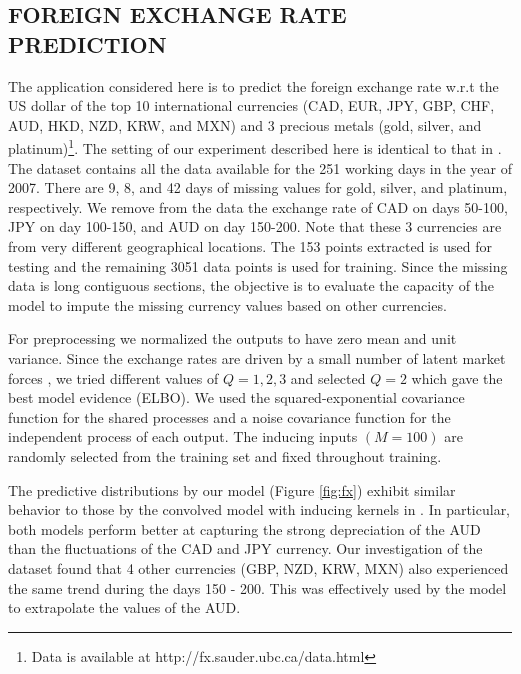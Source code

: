 \subsection{FOREIGN EXCHANGE RATE PREDICTION}
The application considered here is to predict the foreign exchange rate w.r.t the US dollar of the top 10 international currencies (CAD, EUR, JPY, GBP, CHF, AUD, HKD, NZD, KRW, and MXN) and 3 precious metals (gold, silver, and platinum)\footnote{Data is available at http://fx.sauder.ubc.ca/data.html}. 
The setting of our experiment described here is identical to that in \citet{alvarez2010efficient}.
The dataset contains all the data available for the 251 working days in the year of 2007.
There are 9, 8, and 42 days of missing values  for gold, silver, and platinum, respectively.
We remove from the data the exchange rate of CAD on days 50-100, JPY on day 100-150, and AUD on day 150-200.
Note that these 3 currencies are from very different geographical locations. 
The 153 points extracted is used for testing and the remaining 3051 data points is used for training.
Since the missing data is long contiguous sections, the objective is to evaluate the capacity of the model to impute the missing currency values based on other currencies.

For preprocessing we normalized the outputs to have zero mean and unit variance.
Since the exchange rates are driven by a small number of latent market forces \citet{alvarez2010efficient}, we tried different values of $Q = {1,2,3}$ and selected $Q = 2$ which gave the best model evidence (ELBO).
We used the squared-exponential covariance function for the shared processes and a noise covariance function for the independent process of each output.
The inducing inputs $(M = 100)$ are randomly selected from the training set and fixed throughout training.

The predictive distributions by our model (Figure \ref{fig:fx}) exhibit similar behavior to those by the convolved model with inducing kernels in \citet{alvarez2010efficient}.
In particular, both models perform better at capturing the strong depreciation of the AUD than the fluctuations of the CAD and JPY currency.
Our investigation of the dataset found that 4 other currencies (GBP, NZD, KRW, MXN) also experienced the same trend during the days 150 - 200.
This was effectively used by the model to extrapolate the values of the AUD.


